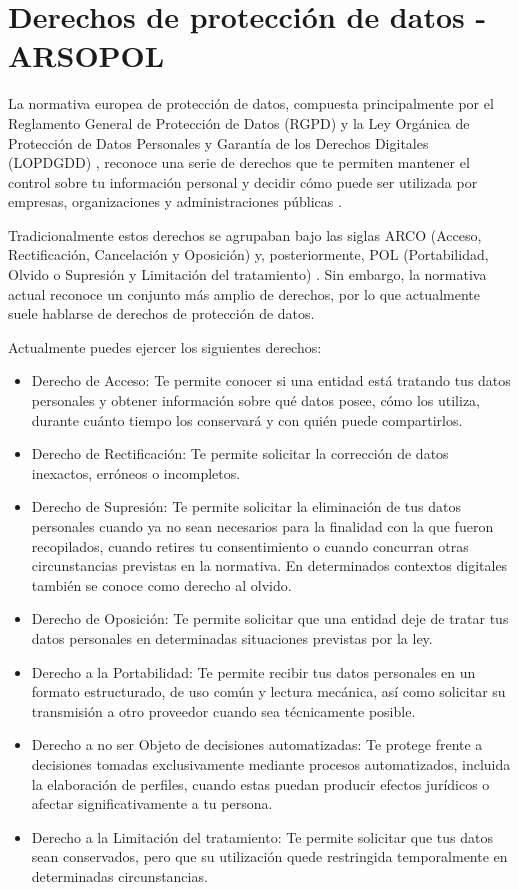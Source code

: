 \documentclass[
  spanish,
  a4paper,
  openany]{book}
\begin{document}
\section{Derechos de protección de datos - ARSOPOL}\label{derechos-de-protecciuxf3n-de-datos---arsopol}

La normativa europea de protección de datos, compuesta principalmente por el Reglamento General de Protección de Datos (RGPD) \citep{RGPD} y la Ley Orgánica de Protección de Datos Personales y Garantía de los Derechos Digitales (LOPDGDD) \citep{LOPDGDD}, reconoce una serie de derechos que te permiten mantener el control sobre tu información personal y decidir cómo puede ser utilizada por empresas, organizaciones y administraciones públicas \citep{AEPD-derechos}.

Tradicionalmente estos derechos se agrupaban bajo las siglas ARCO (Acceso, Rectificación, Cancelación y Oposición) \citep{arco} y, posteriormente, POL (Portabilidad, Olvido o Supresión y Limitación del tratamiento) \citep{pol} . Sin embargo, la normativa actual reconoce un conjunto más amplio de derechos, por lo que actualmente suele hablarse de derechos de protección de datos.

Actualmente puedes ejercer los siguientes derechos:

\begin{itemize}
\item
  Derecho de Acceso: Te permite conocer si una entidad está tratando tus datos personales y obtener información sobre qué datos posee, cómo los utiliza, durante cuánto tiempo los conservará y con quién puede compartirlos.
\item
  Derecho de Rectificación: Te permite solicitar la corrección de datos inexactos, erróneos o incompletos.
\item
  Derecho de Supresión: Te permite solicitar la eliminación de tus datos personales cuando ya no sean necesarios para la finalidad con la que fueron recopilados, cuando retires tu consentimiento o cuando concurran otras circunstancias previstas en la normativa. En determinados contextos digitales también se conoce como derecho al olvido.
\item
  Derecho de Oposición: Te permite solicitar que una entidad deje de tratar tus datos personales en determinadas situaciones previstas por la ley.
\item
  Derecho a la Portabilidad: Te permite recibir tus datos personales en un formato estructurado, de uso común y lectura mecánica, así como solicitar su transmisión a otro proveedor cuando sea técnicamente posible.
\item
  Derecho a no ser Objeto de decisiones automatizadas: Te protege frente a decisiones tomadas exclusivamente mediante procesos automatizados, incluida la elaboración de perfiles, cuando estas puedan producir efectos jurídicos o afectar significativamente a tu persona.
\item
  Derecho a la Limitación del tratamiento: Te permite solicitar que tus datos sean conservados, pero que su utilización quede restringida temporalmente en determinadas circunstancias.
\end{itemize}
\end{document}
